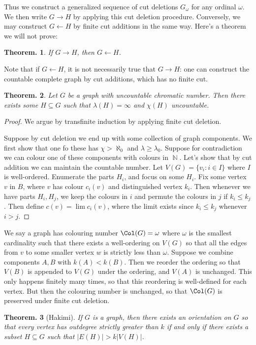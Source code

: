 \documentclass[11pt, a4paper]{memoir}
\DeclareMathOperator{\N}{{\mathbb{N}}}
\theoremstyle{change}
\newtheorem{theorem}{Theorem.}[section]
\theoremstyle{plain}
\theoremstyle{nonumberplain}
\newtheorem{proof}{Proof}
\newcommand{\from}{\ensuremath{\leftarrow}}
\numberwithin{equation}{section}
\begin{document}
Thus we construct a generalized sequence of cut deletions $G_\omega$ for any ordinal $\omega$.
We then write $G\to H$ by applying this cut deletion procedure.
Conversely, we may construct $G\from H$ by finite cut additions in the same way.
Here's a theorem we will not prove:
\begin{theorem}
    If $G\to H$, then $G\from H$.
\end{theorem}
Note that if $G\from H$, it is not necessarily true that $G\to H$: one can construct the countable complete graph by cut additions, which has no finite cut.
\begin{theorem}
    Let $G$ be a graph with uncountable chromatic number.
    Then there exists some $H\subseteq G$ such that $\lambda(H)=\infty$ and $\chi(H)$ uncountable.
\end{theorem}
\begin{proof}
    We argue by transfinite induction by applying finite cut deletion.

    Suppose by cut deletion we end up with some collection of graph components.
    We first show that one fo these has $\chi>\aleph_0$ and $\lambda\geq\lambda_0$.
    Suppose for contradiction we can colour one of these components with colours in $\N$.
    Let's show that by cut addition we can maintain the countable number.
    Let $V(G)=\{v_i:i\in I\}$ where $I$ is well-ordered.
    Enumerate the parts $H_i$, and focus on some $H_i$.
    Fix some vertex $v$ in $B$, where $v$ has colour $c_i(v)$ and distinguished vertex $k_i$.
    Then whenever we have parts $H_i,H_j$, we keep the colours in $i$ and permute the colours in $j$ if $k_i\leq k_j$.
    Then define $c(v)=\lim c_i(v)$, where the limit exists since $k_i\leq k_j$ whenever $i>j$.
\end{proof}
We say a graph has colouring number $\Col(G)=\omega$ where $\omega$ is the smallest cardinality such that there exists a well-ordering on $V(G)$ so that all the edges from $v$ to some smaller vertex $w$ is strictly less than $\omega$.
Suppose we combine components $A,B$ with $k(A)<k(B)$.
Then we reorder the ordering so that $V(B)$ is appended to $V(G)$ under the ordering, and $V(A)$ is unchanged.
This only happens finitely many times, so that this reordering is well-defined for each vertex.
But then the colouring number is unchanged, so that $\Col(G)$ is preserved under finite cut deletion.
\begin{theorem}[Hakimi]
    If $G$ is a graph, then there exists an orientation on $G$ so that every vertex has outdegree strictly greater than $k$ if and only if there exists a subset $H\subseteq G$ such that $|E(H)|>k|V(H)|$.
\end{theorem}
\end{document}
